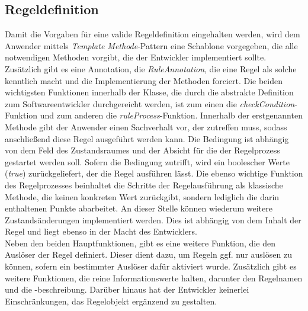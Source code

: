 \subsection{Regeldefinition}
    Damit die Vorgaben für eine valide Regeldefinition eingehalten werden, wird dem Anwender mittels \textit{Template Methode}-Pattern 
    eine Schablone vorgegeben, die alle notwendigen Methoden vorgibt, die der Entwickler implementiert sollte. Zusätzlich gibt es eine Annotation, die 
    \textit{RuleAnnotation}, die eine Regel als solche kenntlich macht und die Implementierung der Methoden forciert. Die beiden wichtigsten Funktionen 
    innerhalb der Klasse, die durch die abstrakte Definition zum Softwareentwickler durchgereicht werden, ist zum einen die \textit{checkCondition}-Funktion und 
    zum anderen die \textit{ruleProcess}-Funktion. Innerhalb der erstgenannten Methode gibt der Anwender einen Sachverhalt vor, der zutreffen muss, sodass anschließend diese 
    Regel ausgeführt werden kann. Die Bedingung ist abhängig von dem Feld des Zustandsraumes und der Absicht für die der Regelprozess gestartet werden soll. Sofern die 
    Bedingung zutrifft, wird ein boolescher Werte (\textit{true}) zurückgeliefert, der die Regel ausführen lässt. Die ebenso wichtige Funktion des Regelprozesses beinhaltet die Schritte der 
    Regelausführung als klassische Methode, die keinen konkreten Wert zurückgibt, sondern lediglich die darin enthaltenen Punkte abarbeitet. An dieser Stelle können wiederum 
    weitere Zustandsänderungen implementiert werden. Dies ist abhängig von dem Inhalt der Regel und liegt ebenso in der Macht des Entwicklers. 
    \\
    Neben den beiden Hauptfunktionen, gibt es eine weitere Funktion, die den Auslöser der Regel definiert. Dieser dient dazu, um Regeln ggf. nur auslösen zu können, sofern ein bestimmter 
    Auslöser dafür aktiviert wurde. Zusätzlich gibt es weitere Funktionen, die reine Informationswerte halten, darunter den Regelnamen und die -beschreibung. Darüber hinaus hat der 
    Entwickler keinerlei Einschränkungen, das Regelobjekt ergänzend zu gestalten.

